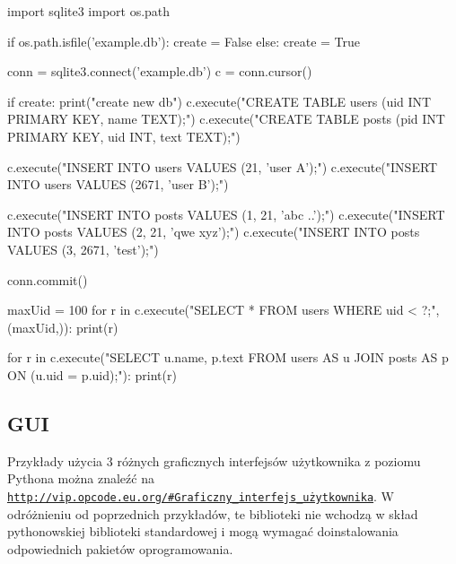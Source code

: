 \begin{CodeFrame*}[python]{}

import sqlite3
import os.path

if os.path.isfile('example.db'):
	create = False
else:
	create = True

conn = sqlite3.connect('example.db')
c = conn.cursor()

if create:
	print("create new db")
	c.execute("CREATE TABLE users (uid INT PRIMARY KEY, name TEXT);")
	c.execute("CREATE TABLE posts (pid INT PRIMARY KEY, uid INT, text TEXT);")
	
	c.execute("INSERT INTO users VALUES (21, 'user A');")
	c.execute("INSERT INTO users VALUES (2671, 'user B');")
	
	c.execute("INSERT INTO posts VALUES (1, 21, 'abc ..');")
	c.execute("INSERT INTO posts VALUES (2, 21, 'qwe xyz');")
	c.execute("INSERT INTO posts VALUES (3, 2671, 'test');")

	conn.commit()

maxUid = 100
for r in c.execute("SELECT * FROM users WHERE uid < ?;", (maxUid,)):
	print(r)

for r in c.execute("SELECT u.name, p.text FROM users AS u JOIN posts AS p ON (u.uid = p.uid);"):
	print(r)
\end{CodeFrame*}

\subsection{GUI}

Przykłady użycia 3 różnych graficznych interfejsów użytkownika z poziomu Pythona można znaleźć na \href{http://vip.opcode.eu.org/#Graficzny_interfejs_u\%C5\%BCytkownika}{\texttt{http://vip.opcode.eu.org/\#Graficzny\_interfejs\_użytkownika}}.
W odróżnieniu od poprzednich przykładów, te biblioteki nie wchodzą w skład pythonowskiej biblioteki standardowej i mogą wymagać doinstalowania odpowiednich pakietów oprogramowania.
